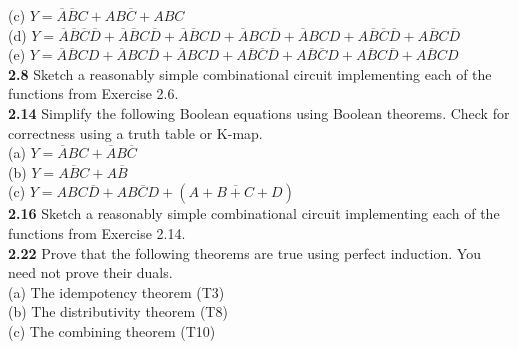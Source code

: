 \documentclass[12pt,a4paper]{report}
\begin{document}
\begin{normalsize}
(c) $ Y = \overline{A}\overline{B}C + AB\overline{C} + ABC $ \\

(d) $ Y = \overline{A}\overline{B}\overline{C}\overline{D} + \overline{A}\overline{B}C\overline{D} + \overline{A}\overline{B}CD + \overline{A}BC\overline{D} + \overline{A}BCD + A\overline{B}\overline{C}\overline{D} + A\overline{B}C\overline{D} $ \\

(e) $ Y = \overline{A}\overline{B}CD + \overline{A}BC\overline{D} + \overline{A}BCD + A\overline{B}\overline{C}\overline{D} + A\overline{B}\overline{C}D + A\overline{B}C\overline{D} + A\overline{B}CD $ \\


\textbf{2.8} Sketch a reasonably simple combinational circuit implementing each of the functions from Exercise 2.6. \\

\textbf{2.14} Simplify the following Boolean equations using Boolean theorems. Check for correctness using a truth table or K-map. \\

(a) $ Y = \overline{A}BC + \overline{A}B\overline{C} $ \\


(b) $ Y = \overline{ABC} + A\overline{B} $ \\

(c) $ Y = ABC\overline{D} + A\overline{BCD} + (\overline{A + B + C + D}) $ \\

\textbf{2.16} Sketch a reasonably simple combinational circuit implementing each of the functions from Exercise 2.14.\\

\textbf{2.22} Prove that the following theorems are true using perfect induction. You need not prove their duals.\\

(a) The idempotency theorem (T3) \\

(b) The distributivity theorem (T8) \\

(c) The combining theorem (T10) \\

\end{normalsize}
\end{document}
